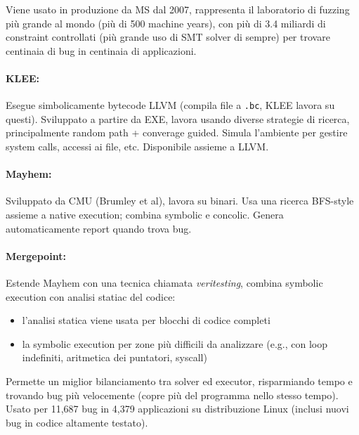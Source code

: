 Viene usato in produzione da MS dal 2007, rappresenta il laboratorio di fuzzing più grande al mondo (più di 500 machine years), con più di 3.4 miliardi di constraint controllati (più grande uso di SMT solver di sempre) per trovare centinaia di bug in centinaia di applicazioni.\\

\paragraph{KLEE:} Esegue simbolicamente bytecode LLVM (compila file a \texttt{.bc}, KLEE lavora su questi). Sviluppato a partire da EXE, lavora usando diverse strategie di ricerca, principalmente random path + converage guided. Simula l'ambiente per gestire system calls, accessi ai file, etc. Disponibile assieme a LLVM.\\

\paragraph{Mayhem:} Sviluppato da CMU (Brumley et al), lavora su binari. Usa una ricerca BFS-style assieme a native execution; combina symbolic e concolic. Genera automaticamente report quando trova bug.\\

\paragraph{Mergepoint:} Estende Mayhem con una tecnica chiamata \textit{veritesting}, combina symbolic execution con analisi statiac del codice:
\begin{itemize}
	\item l'analisi statica viene usata per blocchi di codice completi
	\item la symbolic execution per zone più difficili da analizzare (e.g., con loop indefiniti, aritmetica dei puntatori, syscall)
\end{itemize}
Permette un miglior bilanciamento tra solver ed executor, risparmiando tempo e trovando bug più velocemente (copre più del programma nello stesso tempo). Usato per 11,687 bug in 4,379 applicazioni su distribuzione Linux (inclusi nuovi bug in codice altamente testato).\\

